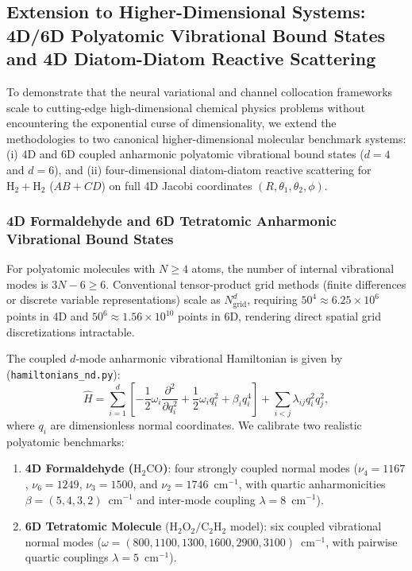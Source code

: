 \documentclass[11pt,a4paper]{article}
\newcommand{\cmi}{\ensuremath{\mathrm{cm}^{-1}}}
\begin{document}
\subsection{Extension to Higher-Dimensional Systems: 4D/6D Polyatomic Vibrational Bound States and 4D Diatom-Diatom Reactive Scattering}
\label{sec:high_dim_systems}

To demonstrate that the neural variational and channel collocation frameworks scale to cutting-edge high-dimensional chemical physics problems without encountering the exponential curse of dimensionality, we extend the methodologies to two canonical higher-dimensional molecular benchmark systems: (i) 4D and 6D coupled anharmonic polyatomic vibrational bound states ($d = 4$ and $d = 6$), and (ii) four-dimensional diatom-diatom reactive scattering for $\mathrm{H}_2 + \mathrm{H}_2$ ($AB + CD$) on full 4D Jacobi coordinates $(R, \theta_1, \theta_2, \phi)$.

\subsubsection{4D Formaldehyde and 6D Tetratomic Anharmonic Vibrational Bound States}
For polyatomic molecules with $N \ge 4$ atoms, the number of internal vibrational modes is $3N - 6 \ge 6$. Conventional tensor-product grid methods (finite differences or discrete variable representations) scale as $N_{\mathrm{grid}}^d$, requiring $50^4 \approx 6.25 \times 10^6$ points in 4D and $50^6 \approx 1.56 \times 10^{10}$ points in 6D, rendering direct spatial grid discretizations intractable.

The coupled $d$-mode anharmonic vibrational Hamiltonian is given by (\texttt{hamiltonians\_}\allowbreak\texttt{nd.py}):
\begin{equation}
 \hat H = \sum_{i=1}^d \left[ -\frac{1}{2} \omega_i \frac{\partial^2}{\partial q_i^2} + \frac{1}{2} \omega_i q_i^2 + \beta_i q_i^4 \right] + \sum_{i < j} \lambda_{ij} q_i^2 q_j^2 ,
\end{equation}
where $q_i$ are dimensionless normal coordinates. We calibrate two realistic polyatomic benchmarks:
\begin{enumerate}
 \item \textbf{4D Formaldehyde ($\mathrm{H}_2\mathrm{CO}$)}: four strongly coupled normal modes ($\nu_4 = 1167$, $\nu_6 = 1249$, $\nu_3 = 1500$, and $\nu_2 = 1746$~\cmi, with quartic anharmonicities $\beta = (5, 4, 3, 2)$~\cmi{} and inter-mode coupling $\lambda = 8$~\cmi).
 \item \textbf{6D Tetratomic Molecule} ($\mathrm{H}_2\mathrm{O}_2 / \mathrm{C}_2\mathrm{H}_2$ model): six coupled vibrational normal modes ($\omega = (800, 1100, 1300, 1600, 2900, 3100)$~\cmi, with pairwise quartic couplings $\lambda = 5$~\cmi).
\end{enumerate}
\end{document}
